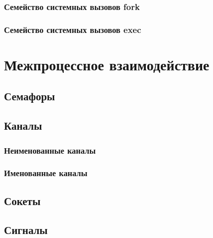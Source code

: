 \documentclass[oneside]{book}
\begin{document}
         \subsection{Семейство системных вызовов fork}
         

         \subsection{Семейство системных вызовов exec}
         

   \chapter{Межпроцессное взаимодействие}
   	

      \section{Семафоры}
      

      \section{Каналы}

         \subsection{Неименованные каналы}
         

         \subsection{Именованные каналы}
         	

      \section{Сокеты}
      

      \section{Сигналы}
      
\end{document}
